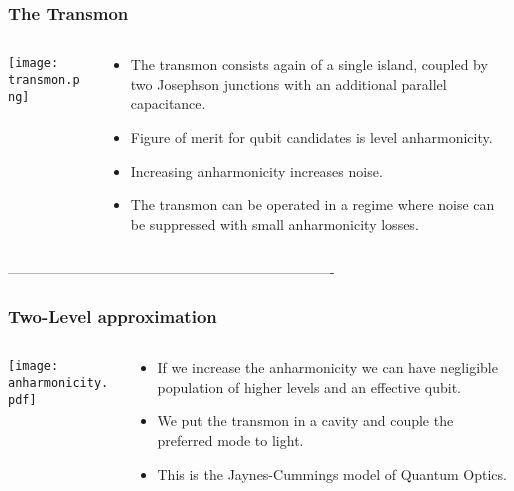 \documentclass{beamer}
\begin{document}
\begin{frame}
    \frametitle{The Transmon}
    \begin{columns}[c]
        \begin{column}{0.4\linewidth}
            \begin{block}{}
                \vspace{-0.5cm}
                \texttt{[image: transmon.png]}
            \end{block}
        \end{column}
        \begin{column}{0.6\linewidth}
            \begin{itemize}
                \item The transmon consists again of a single island, 
                        coupled by two Josephson junctions with an
                        additional parallel capacitance. 
                \item Figure of merit for qubit candidates is level 
                        anharmonicity. 
                \item Increasing anharmonicity increases noise.
                \item The transmon can be operated in a regime 
                        where noise can be suppressed with small 
                        anharmonicity losses. 
            \end{itemize}
        \end{column}
    \end{columns}
\end{frame}
----------------------------------------------------------------------
\begin{frame}
    \frametitle{Two-Level approximation}
    \begin{columns}[c]
        \begin{column}{0.55\linewidth}
    \texttt{[image: anharmonicity.pdf]}
        \end{column}
        \begin{column}{0.45\linewidth}
            \begin{itemize}
                \item If we increase the anharmonicity we can 
                        have negligible population of higher levels 
                        and an effective qubit.
                \item We put the transmon in a cavity and couple 
                        the preferred mode to light.
                \item This is the Jaynes-Cummings model of 
                        Quantum Optics. 
            \end{itemize}
        \end{column}
    \end{columns}
\end{frame}
\end{document}
